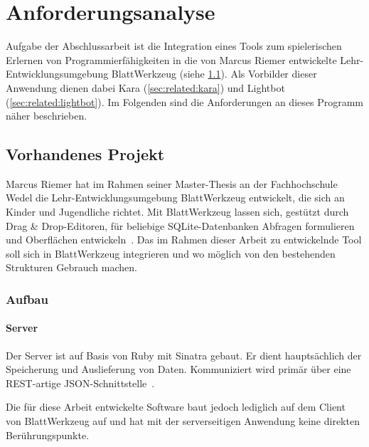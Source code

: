 \chapter{Anforderungsanalyse}
\label{sec:requirements}

Aufgabe der Abschlussarbeit ist die Integration eines Tools zum spielerischen Erlernen von Programmierfähigkeiten in die von Marcus Riemer entwickelte Lehr-Entwicklungsumgebung BlattWerkzeug (siehe \ref{sec:requirements:existing}). Als Vorbilder dieser Anwendung dienen dabei Kara (\ref{sec:related:kara}) und Lightbot (\ref{sec:related:lightbot}). Im Folgenden sind die Anforderungen an dieses Programm näher beschrieben.

\section{Vorhandenes Projekt}
\label{sec:requirements:existing}

Marcus Riemer hat im Rahmen seiner Master-Thesis an der Fachhochschule Wedel die Lehr-Entwicklungsumgebung BlattWerkzeug entwickelt, die sich an Kinder und Jugendliche richtet. Mit BlattWerkzeug lassen sich, gestützt durch Drag \& Drop-Editoren, für beliebige SQLite-Datenbanken Abfragen formulieren und Oberflächen entwickeln~\cite[2]{riemer2016}. Das im Rahmen dieser Arbeit zu entwickelnde Tool soll sich in BlattWerkzeug integrieren und wo möglich von den bestehenden Strukturen Gebrauch machen.

\subsection{Aufbau}

\subsubsection{Server}

Der Server ist auf Basis von Ruby mit Sinatra gebaut. Er dient hauptsächlich der Speicherung und Auslieferung von Daten. Kommuniziert wird primär über eine REST-artige JSON-Schnittstelle~\cite[94]{riemer2016}.

Die für diese Arbeit entwickelte Software baut jedoch lediglich auf dem Client von BlattWerkzeug auf und hat mit der serverseitigen Anwendung keine direkten Berührungspunkte.


